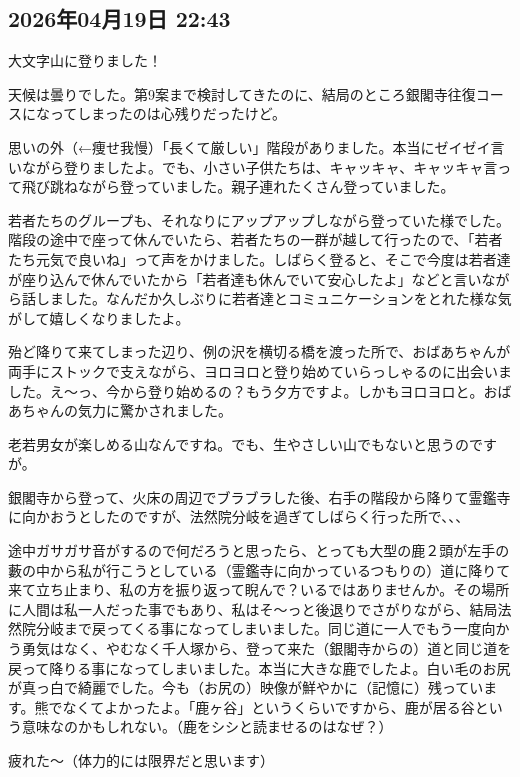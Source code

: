 \documentclass[facebook_diary.tex]{subfiles}
\begin{document}
\subsection*{2026年04月19日 22:43}

大文字山に登りました！

天候は曇りでした。第9案まで検討してきたのに、結局のところ銀閣寺往復コースになってしまったのは心残りだったけど。


思いの外（←痩せ我慢）「長くて厳しい」階段がありました。本当にゼイゼイ言いながら登りましたよ。でも、小さい子供たちは、キャッキャ、キャッキャ言って飛び跳ねながら登っていました。親子連れたくさん登っていました。

若者たちのグループも、それなりにアップアップしながら登っていた様でした。階段の途中で座って休んでいたら、若者たちの一群が越して行ったので、「若者たち元気で良いね」って声をかけました。しばらく登ると、そこで今度は若者達が座り込んで休んでいたから「若者達も休んでいて安心したよ」などと言いながら話しました。なんだか久しぶりに若者達とコミュニケーションをとれた様な気がして嬉しくなりましたよ。

殆ど降りて来てしまった辺り、例の沢を横切る橋を渡った所で、おばあちゃんが両手にストックで支えながら、ヨロヨロと登り始めていらっしゃるのに出会いました。え〜っ、今から登り始めるの？もう夕方ですよ。しかもヨロヨロと。おばあちゃんの気力に驚かされました。

老若男女が楽しめる山なんですね。でも、生やさしい山でもないと思うのですが。


銀閣寺から登って、火床の周辺でブラブラした後、右手の階段から降りて霊鑑寺に向かおうとしたのですが、法然院分岐を過ぎてしばらく行った所で、、、

途中ガサガサ音がするので何だろうと思ったら、とっても大型の鹿２頭が左手の藪の中から私が行こうとしている（霊鑑寺に向かっているつもりの）道に降りて来て立ち止まり、私の方を振り返って睨んで？いるではありませんか。その場所に人間は私一人だった事でもあり、私はそ〜っと後退りでさがりながら、結局法然院分岐まで戻ってくる事になってしまいました。同じ道に一人でもう一度向かう勇気はなく、やむなく千人塚から、登って来た（銀閣寺からの）道と同じ道を戻って降りる事になってしまいました。本当に大きな鹿でしたよ。白い毛のお尻が真っ白で綺麗でした。今も（お尻の）映像が鮮やかに（記憶に）残っています。熊でなくてよかったよ。「鹿ヶ谷」というくらいですから、鹿が居る谷という意味なのかもしれない。（鹿をシシと読ませるのはなぜ？）


疲れた〜（体力的には限界だと思います）
\end{document}
